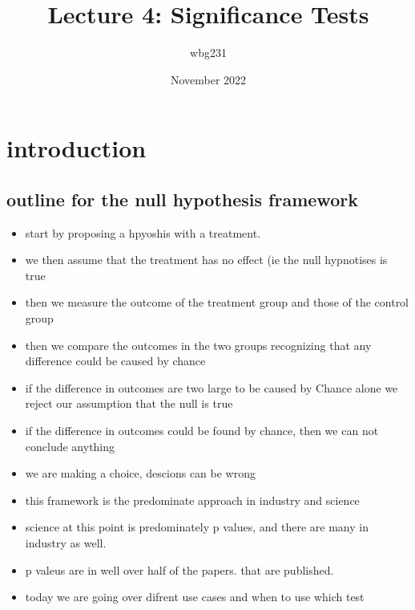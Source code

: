 \documentclass{article}
\title{Lecture 4: Significance Tests }
\author{wbg231 }
\date{November 2022}
\begin{document}
\maketitle

\section{introduction}
\subsection{outline for the null hypothesis framework}
\begin{itemize}
\item start by proposing a hpyoshis with a treatment. 
\item we then assume that the treatment has no effect (ie the null hypnotises is true
\item then we measure the outcome of the treatment group and those of the control group
\item then we compare the outcomes in the two groups recognizing that any difference could be caused by chance
\item if the difference in outcomes are two large to be caused by Chance alone we reject our assumption that the null is true
\item if the difference in outcomes could be found by chance, then we can not conclude anything 
\item we are making a choice, descions can be wrong 
\item this framework is the predominate approach in industry and science 
\item science at this point is predominately p values, and there are many in industry as well. 
\item p valeus are in well over half of the papers. that are published.
\item today we are going over difrent use cases and when to use which test 

\end{itemize}
\end{document}
